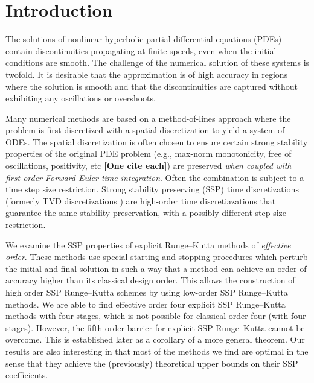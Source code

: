 \section{Introduction}\label{sec:Intro}

The solutions of nonlinear hyperbolic partial differential equations (PDEs) contain discontinuities propagating at finite speeds, even when the initial conditions are smooth.
The challenge of the numerical solution of these systems is twofold.
It is desirable that the approximation is of high accuracy in regions where the solution is smooth and that the discontinuities are captured without exhibiting any oscillations or overshoots.

Many numerical methods are based on a method-of-lines approach where the problem is first discretized with a spatial discretization to yield a system of ODEs.
The spatial discretization is often chosen to ensure certain strong stability properties of the original PDE problem (e.g., max-norm monotonicity, free of oscillations, positivity, etc {\bf [One cite each]}) are preserved \emph{when coupled with first-order Forward Euler time integration}.
Often the combination is subject to a time step size restriction.
Strong stability preserving (SSP) time discretizations (formerly TVD discretizations \cite{Gottlieb1998}) are high-order time discretiazations that guarantee the same stability preservation, with a possibly different step-size restriction.


We examine the SSP properties of explicit Runge--Kutta methods of \emph{effective order}.
These methods use special starting and stopping procedures which perturb the initial and final solution in such a way that a method can achieve an order of accuracy higher than its classical design order.
This allows the construction of high order SSP Runge--Kutta schemes by using low-order SSP Runge--Kutta methods.
We are able to find effective order four explicit SSP Runge--Kutta methods with four stages, which is not possible for classical order four (with four stages). However, the fifth-order barrier for explicit SSP Runge--Kutta \cite{Ruuth2002} cannot be overcome.
This is  established later as a corollary of a more general theorem.
Our results are also interesting in that most of the methods we find are optimal in the sense that they achieve the (previously) theoretical upper bounds on their SSP coefficients.

